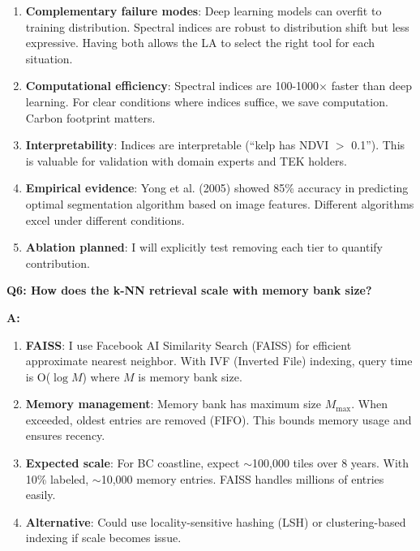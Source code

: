 \documentclass[11pt]{article}
\begin{document}
\begin{enumerate}
    \item \textbf{Complementary failure modes}: Deep learning models can overfit to training distribution. Spectral indices are robust to distribution shift but less expressive. Having both allows the LA to select the right tool for each situation.

    \item \textbf{Computational efficiency}: Spectral indices are 100-1000$\times$ faster than deep learning. For clear conditions where indices suffice, we save computation. Carbon footprint matters.

    \item \textbf{Interpretability}: Indices are interpretable (``kelp has NDVI $>$ 0.1''). This is valuable for validation with domain experts and TEK holders.

    \item \textbf{Empirical evidence}: Yong et al. (2005) showed 85\% accuracy in predicting optimal segmentation algorithm based on image features. Different algorithms excel under different conditions.

    \item \textbf{Ablation planned}: I will explicitly test removing each tier to quantify contribution.
\end{enumerate}

\textbf{Q6: How does the k-NN retrieval scale with memory bank size?}

\textbf{A:}

\begin{enumerate}
    \item \textbf{FAISS}: I use Facebook AI Similarity Search (FAISS) for efficient approximate nearest neighbor. With IVF (Inverted File) indexing, query time is O($\log M$) where $M$ is memory bank size.

    \item \textbf{Memory management}: Memory bank has maximum size $M_{\text{max}}$. When exceeded, oldest entries are removed (FIFO). This bounds memory usage and ensures recency.

    \item \textbf{Expected scale}: For BC coastline, expect $\sim$100,000 tiles over 8 years. With 10\% labeled, $\sim$10,000 memory entries. FAISS handles millions of entries easily.

    \item \textbf{Alternative}: Could use locality-sensitive hashing (LSH) or clustering-based indexing if scale becomes issue.
\end{enumerate}
\end{document}
